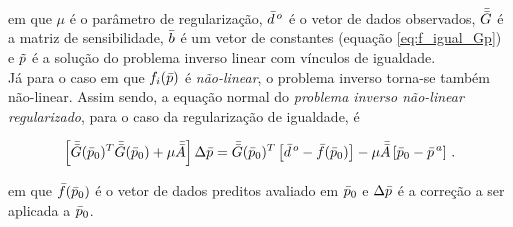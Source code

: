 \noindent em que $\mu$ é o parâmetro de regularização, $\bar{d}^{\thinspace o}$
é o vetor de dados observados, $\bar{\bar{G}}$ é a matriz de sensibilidade, $\bar{b}$
é um vetor de constantes (equação \ref{eq:f_igual_Gp}) e $\tilde{p}$ é a solução
do problema inverso linear com vínculos de igualdade.
\\
\indent Já para o caso em que $f_i(\bar{p})$ é {\it não-linear}, o problema
inverso torna-se também não-linear. Assim sendo, a equação normal do
{\it problema inverso não-linear regularizado}, para o caso da regularização de
igualdade, é

\begin{equation}
\left[\bar{\bar{G}}(\bar{p}_0)^T\bar{\bar{G}}(\bar{p}_0) +
      \mu\bar{\bar{A}}\right]\Delta\bar{p} =
\bar{\bar{G}}(\bar{p}_0)^T \left[\bar{d}^{\thinspace o} - \bar{f}(\bar{p}_0)\right] -
\mu\bar{\bar{A}}\left[\bar{p}_0 - \bar{p}^{\thinspace a}\right]
    \thinspace .
\end{equation}

\noindent em que $\bar{f}(\bar{p}_0)$ é o vetor de dados preditos avaliado em
$\bar{p}_0$ e $\Delta\bar{p}$ é a correção a ser aplicada a $\bar{p}_0$.

